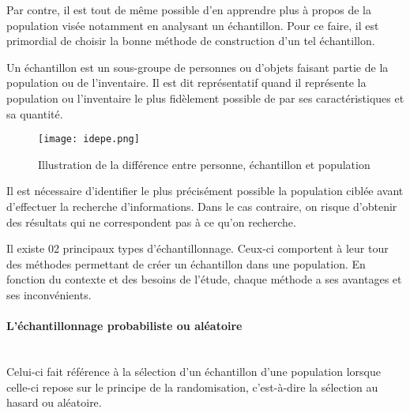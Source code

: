 \noindent

	Par contre, il est tout de même possible d’en apprendre plus à propos de la population visée notamment en analysant un échantillon. Pour ce faire, il est primordial de choisir la bonne méthode de construction d'un tel échantillon. 
	
\noindent

	Un échantillon est un sous-groupe de personnes ou d'objets faisant partie de la population ou de l'inventaire. Il est dit représentatif quand il représente la population ou l'inventaire le plus fidèlement possible de par ses caractéristiques et sa quantité. 
	\begin{figure}[hbtp]
		\centering
		\texttt{[image: idepe.png]} 
		\caption{Illustration de la différence entre personne, échantillon et population}
		\label{Illustration de la différence entre personne, échantillon et population}
	\end{figure}

\noindent
	
	Il est nécessaire d'identifier le plus précisément possible la population ciblée avant d’effectuer la recherche d’informations. Dans le cas contraire, on risque d’obtenir des résultats qui ne correspondent pas à ce qu’on recherche.
	
\noindent

	Il existe 02 principaux types d’échantillonnage. Ceux-ci comportent à leur tour des méthodes permettant de créer un échantillon dans une population. En fonction du contexte et des besoins de l'étude, chaque méthode a ses avantages et ses inconvénients.
	
	\paragraph{L’échantillonnage probabiliste ou aléatoire} ~~\\
	Celui-ci fait référence à la sélection d’un échantillon d’une population lorsque celle-ci repose sur le principe de la randomisation, c’est-à-dire la sélection au hasard ou aléatoire. 

\noindent

